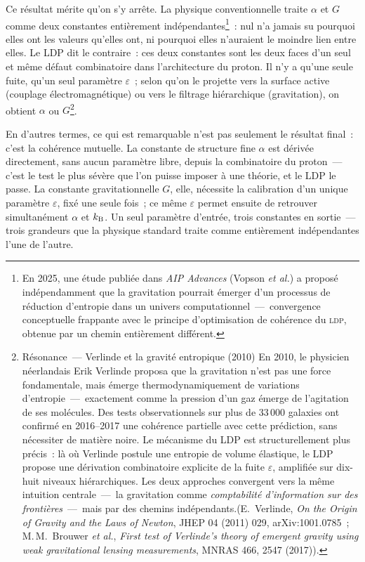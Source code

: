 \documentclass[12pt, a4paper, openright]{book}
\newcommand{\ldp}{\textsc{ldp}}
\begin{document}
Ce résultat mérite qu'on s'y arrête. La physique conventionnelle traite $\alpha$ et $G$ comme deux constantes entièrement indépendantes\footnote{En 2025, une étude publiée dans \textit{AIP Advances} (Vopson \textit{et al.}) a proposé indépendamment que la gravitation pourrait émerger d'un processus de réduction d'entropie dans un univers computationnel~---~convergence conceptuelle frappante avec le principe d'optimisation de cohérence du \ldp{}, obtenue par un chemin entièrement différent.}~: nul n'a jamais su pourquoi elles ont les valeurs qu'elles ont, ni pourquoi elles n'auraient le moindre lien entre elles. Le LDP dit le contraire~: ces deux constantes sont les deux faces d'un seul et même défaut combinatoire dans l'architecture du proton. Il n'y a qu'une seule fuite, qu'un seul paramètre $\varepsilon$~; selon qu'on le projette vers la surface active (couplage électromagnétique) ou vers le filtrage hiérarchique (gravitation), on obtient $\alpha$ ou $G$\footnote{Résonance~--- Verlinde et la gravité entropique (2010) En 2010, le physicien néerlandais Erik Verlinde proposa que la gravitation n'est pas une force fondamentale, mais émerge thermodynamiquement de variations d'entropie~---~exactement comme la pression d'un gaz émerge de l'agitation de ses molécules. Des tests observationnels sur plus de 33\,000 galaxies ont confirmé en 2016--2017 une cohérence partielle avec cette prédiction, sans nécessiter de matière noire. Le mécanisme du LDP est structurellement plus précis~: là où Verlinde postule une entropie de volume élastique, le LDP propose une dérivation combinatoire explicite de la fuite $\varepsilon$, amplifiée sur dix-huit niveaux hiérarchiques. Les deux approches convergent vers la même intuition centrale~---~la gravitation comme \emph{comptabilité d'information sur des frontières}~---~mais par des chemins indépendants.(E.\ Verlinde, \textit{On the Origin of Gravity and the Laws of Newton}, JHEP 04 (2011) 029, arXiv:1001.0785~; M.\,M.\ Brouwer \textit{et al.}, \textit{First test of Verlinde's theory of emergent gravity using weak gravitational lensing measurements}, MNRAS 466, 2547 (2017)).}.

\medskip

En d'autres termes, ce qui est remarquable n'est pas seulement le résultat final~: c'est la cohérence mutuelle. La constante de structure fine $\alpha$ est dérivée directement, sans aucun paramètre libre, depuis la combinatoire du proton~--- c'est le test le plus sévère que l'on puisse imposer à une théorie, et le LDP le passe. La constante gravitationnelle $G$, elle, nécessite la calibration d'un unique paramètre $\varepsilon$, fixé une seule fois~; ce même $\varepsilon$ permet ensuite de retrouver simultanément $\alpha$ et $k_{\rm B}$. Un seul paramètre d'entrée, trois constantes en sortie~--- trois grandeurs que la physique standard traite comme entièrement indépendantes l'une de l'autre.
\end{document}
